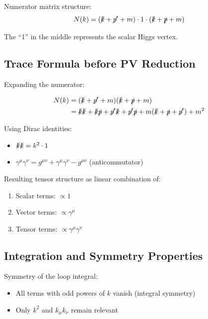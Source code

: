 	Numerator matrix structure:
	\begin{equation}
		N(k) = (\slashed{k} + \slashed{p'} + m) \cdot 1 \cdot (\slashed{k} + \slashed{p} + m)
	\end{equation}
	
	The ``1'' in the middle represents the scalar Higgs vertex.
	
	\subsection{Trace Formula before PV Reduction}
	
	Expanding the numerator:
	
	\begin{align}
		N(k) &= (\slashed{k} + \slashed{p'} + m)(\slashed{k} + \slashed{p} + m)\\
		&= \slashed{k}\slashed{k} + \slashed{k}\slashed{p} + \slashed{p'}\slashed{k} + \slashed{p'}\slashed{p} + m(\slashed{k} + \slashed{p} + \slashed{p'}) + m^2
	\end{align}
	
	Using Dirac identities:
	\begin{itemize}
		\item $\slashed{k}\slashed{k} = k^2 \cdot 1$
		\item $\gamma^\mu\gamma^\nu = g^{\mu\nu} + \gamma^\mu\gamma^\nu - g^{\mu\nu}$ (anticommutator)
	\end{itemize}
	
	Resulting tensor structure as linear combination of:
	\begin{enumerate}
		\item Scalar terms: $\propto 1$
		\item Vector terms: $\propto \gamma^\mu$  
		\item Tensor terms: $\propto \gamma^\mu\gamma^\nu$
	\end{enumerate}
	
	\subsection{Integration and Symmetry Properties}
	
	Symmetry of the loop integral:
	\begin{itemize}
		\item All terms with odd powers of $k$ vanish (integral symmetry)
		\item Only $k^2$ and $k_\mu k_\nu$ remain relevant
	\end{itemize}
	

